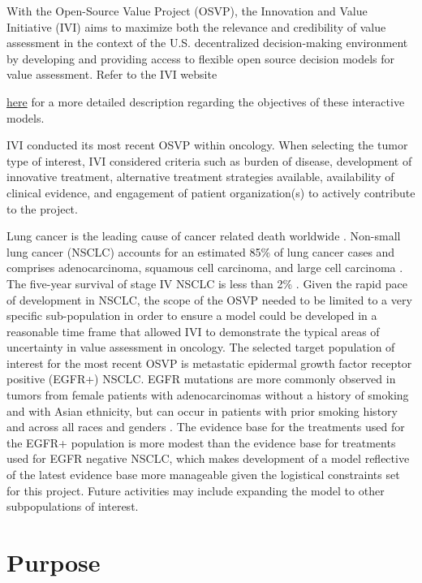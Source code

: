 \documentclass[11pt,final,fleqn]{article}\usepackage[]{graphicx}\usepackage[]{color}
\theoremstyle{plain}
\begin{document}
With the Open-Source Value Project (OSVP), the Innovation and Value Initiative (IVI) aims to maximize both the relevance and credibility of value assessment in the context of the U.S. decentralized decision-making environment by developing and providing access to flexible open source decision models for value assessment. Refer to the IVI website {\href{https://www.thevalueinitiative.org/open-source-value-project/}{here} for a more detailed description regarding the objectives of these interactive models. 

IVI conducted its most recent OSVP within oncology. When selecting the tumor type of interest, IVI considered criteria such as burden of disease, development of innovative treatment, alternative treatment strategies available, availability of clinical evidence, and engagement of patient organization(s) to actively contribute to the project. 

Lung cancer is the leading cause of cancer related death worldwide \citep{jemal2011global}. Non-small lung cancer (NSCLC) accounts for an estimated 85\% of lung cancer cases and comprises adenocarcinoma, squamous cell carcinoma, and large cell carcinoma \citep{d2010metastatic}. The five-year survival of stage IV NSCLC is less than 2\% \citep{cetin2011survival}. Given the rapid pace of development in NSCLC, the scope of the OSVP needed to be limited to a very specific sub-population in order to ensure a model could be developed in a reasonable time frame that allowed IVI to demonstrate the typical areas of uncertainty in value assessment in oncology. The selected target population of interest for the most recent OSVP is metastatic epidermal growth factor receptor positive (EGFR+) NSCLC. EGFR mutations are more commonly observed in tumors from female patients with adenocarcinomas without a history of smoking and with Asian ethnicity, but can occur in patients with prior smoking history and across all races and genders \citep{lynch2004activating}. The evidence base for the treatments used for the EGFR+ population is more modest than the evidence base for treatments used for EGFR negative NSCLC, which makes development of a model reflective of the latest evidence base more manageable given the logistical constraints set for this project. Future activities may include expanding the model to other subpopulations of interest.

\section{Purpose}\label{sec:purpose}
}
\end{document}
